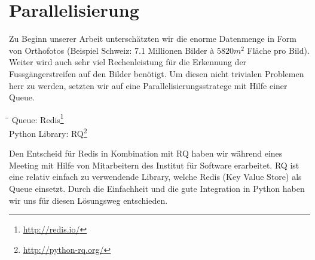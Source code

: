 \section{Parallelisierung}
Zu Beginn unserer Arbeit unterschätzten wir die enorme Datenmenge in Form von Orthofotos (Beispiel Schweiz: 7.1 Millionen Bilder à $5820 m^{2}$ Fläche pro Bild). Weiter wird auch sehr viel Rechenleistung für die Erkennung der Fussgängerstreifen auf den Bilder benötigt. Um diesen nicht trivialen Problemen herr zu werden, setzten wir auf eine Parallelisierungsstratege mit Hilfe einer Queue.

\begin{tabbing}
    \hspace*{3cm}\=\hspace*{6cm}\= \kill
	Queue: \> Redis\footnote{\url{http://redis.io/}} \\
	Python Library: \> RQ\footnote{\url{http://python-rq.org/}} \\
\end{tabbing}

Den Entscheid für Redis in Kombination mit RQ haben wir während eines Meeting mit Hilfe von Mitarbeitern des Institut für Software erarbeitet. RQ ist eine relativ einfach zu verwendende Library, welche Redis (Key Value Store) als Queue einsetzt. Durch die Einfachheit und die gute Integration in Python haben wir uns für diesen Lösungsweg entschieden.

